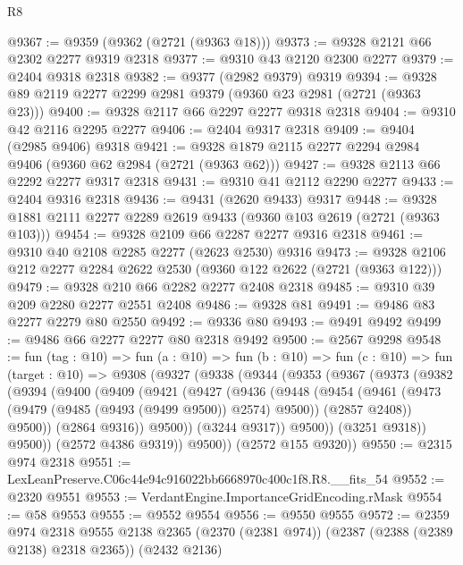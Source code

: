 \begin{lexlean}{R8}
\begin{coremodule}
@9367 := @9359 (@9362 (@2721 (@9363 @18)))
@9373 := @9328 @2121 @66 @2302 @2277 @9319 @2318
@9377 := @9310 @43 @2120 @2300 @2277
@9379 := @2404 @9318 @2318
@9382 := @9377 (@2982 @9379) @9319
@9394 := @9328 @89 @2119 @2277 @2299 @2981 @9379 (@9360 @23 @2981 (@2721 (@9363 @23)))
@9400 := @9328 @2117 @66 @2297 @2277 @9318 @2318
@9404 := @9310 @42 @2116 @2295 @2277
@9406 := @2404 @9317 @2318
@9409 := @9404 (@2985 @9406) @9318
@9421 := @9328 @1879 @2115 @2277 @2294 @2984 @9406 (@9360 @62 @2984 (@2721 (@9363 @62)))
@9427 := @9328 @2113 @66 @2292 @2277 @9317 @2318
@9431 := @9310 @41 @2112 @2290 @2277
@9433 := @2404 @9316 @2318
@9436 := @9431 (@2620 @9433) @9317
@9448 := @9328 @1881 @2111 @2277 @2289 @2619 @9433 (@9360 @103 @2619 (@2721 (@9363 @103)))
@9454 := @9328 @2109 @66 @2287 @2277 @9316 @2318
@9461 := @9310 @40 @2108 @2285 @2277 (@2623 @2530) @9316
@9473 := @9328 @2106 @212 @2277 @2284 @2622 @2530 (@9360 @122 @2622 (@2721 (@9363 @122)))
@9479 := @9328 @210 @66 @2282 @2277 @2408 @2318
@9485 := @9310 @39 @209 @2280 @2277 @2551 @2408
@9486 := @9328 @81
@9491 := @9486 @83 @2277 @2279 @80 @2550
@9492 := @9336 @80
@9493 := @9491 @9492
@9499 := @9486 @66 @2277 @2277 @80 @2318 @9492
@9500 := @2567 @9298
@9548 := fun (tag : @10) =>
  fun (a : @10) =>
  fun (b : @10) =>
  fun (c : @10) =>
  fun (target : @10) =>
  @9308
    (@9327
      (@9338
        (@9344
          (@9353
            (@9367
              (@9373
                (@9382
                  (@9394
                    (@9400
                      (@9409
                        (@9421
                          (@9427
                            (@9436
                              (@9448
                                (@9454
                                  (@9461
                                    (@9473 (@9479 (@9485 (@9493 (@9499 @9500)) @2574) @9500))
                                    (@2857 @2408))
                                  @9500))
                              (@2864 @9316))
                            @9500))
                        (@3244 @9317))
                      @9500))
                  (@3251 @9318))
                @9500))
            (@2572 @4386 @9319))
          @9500))
      (@2572 @155 @9320))
@9550 := @2315 @974 @2318
@9551 := LexLeanPreserve.C06c44e94c916022bb6668970c400c1f8.R8.__fits_54
@9552 := @2320 @9551
@9553 := VerdantEngine.ImportanceGridEncoding.rMask
@9554 := @58 @9553
@9555 := @9552 @9554
@9556 := @9550 @9555
@9572 := @2359
    @974
    @2318
    @9555
    @2138
    @2365
    (@2370 (@2381 @974))
    (@2387 (@2388 (@2389 @2138) @2318 @2365))
    (@2432 @2136)

\end{coremodule}
\end{lexlean}
